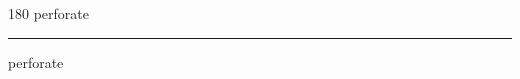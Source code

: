
\begin{frame}
\begin{center}
\begin{turn}{180}
{\fontsize{2.5cm}{1em}\selectfont perforate}
\end{turn}
\vspace{1em}\par  
\hrule
\vspace{1em}\par  
{\fontsize{2.5cm}{1em}\selectfont perforate}
\end{center}
\end{frame}
